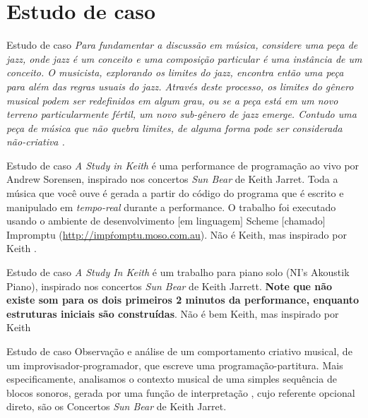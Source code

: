 \documentclass[aspectratio=169]{beamer}
\begin{document}
\newcommand{\csf}[2]{
$\mathcal{#1}_{\emph{#2}}$
}


%

\section{Estudo de caso}
\begin{frame}{Estudo de caso}
\emph{Para fundamentar a discussão em música, considere uma peça de \emph{jazz}, onde \emph{jazz} é um conceito e uma composição particular é uma instância de um conceito. O musicista, explorando os limites do \emph{jazz}, encontra então uma peça para além das regras usuais do \emph{jazz}. Através deste processo, os limites do gênero musical podem ser redefinidos em algum grau, ou se a peça está em um novo terreno particularmente fértil, um novo sub-gênero de \emph{jazz} emerge. Contudo uma peça de música que não quebra limites, de alguma forma pode ser considerada não-criativa \cite[p.~117]{McLean2011}.}
\end{frame}

\begin{frame}{Estudo de caso}
\emph{A Study in Keith} é uma performance de programação ao vivo por Andrew Sorensen, inspirado nos concertos \emph{Sun Bear} de Keith Jarret. Toda a música que você ouve é gerada a partir do código do programa que é escrito e manipulado em \emph{tempo-real} durante a performance. O trabalho foi executado usando o ambiente de desenvolvimento $[$em linguagem$]$ Scheme $[$chamado$]$ Impromptu (\url{http://impŕomptu.moso.com.au}). Não é Keith, mas inspirado por Keith \cite{sorensen_youtube_2014}.
\end{frame}

\begin{frame}{Estudo de caso}
\emph{A Study In Keith} é um trabalho para piano solo (NI's Akoustik Piano), inspirado nos concertos \emph{Sun Bear} de Keith Jarrett. \textbf{Note que não existe som para os dois primeiros 2 minutos da performance, enquanto estruturas iniciais são construídas}. Não é bem Keith, mas inspirado por Keith \cite{sorensen_keith_2009}
\end{frame}

\begin{frame}{Estudo de caso}
Observação e análise de um comportamento criativo musical, de um improvisador-programador, que escreve uma programação-partitura. Mais especificamente, analisamos o contexto musical de uma simples sequência de blocos sonoros, gerada por uma função de interpretação , cujo referente opcional direto, são os Concertos \emph{Sun Bear} de Keith Jarret.
\end{frame}
\end{document}
